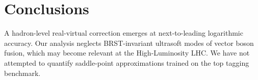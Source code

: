 \section{Conclusions}\label{sec:conclusions}

A hadron-level real-virtual correction emerges at next-to-leading
logarithmic accuracy. Our analysis neglects BRST-invariant ultrasoft
modes of vector boson fusion, which may become relevant at the
High-Luminosity LHC. We have not attempted to quantify saddle-point
approximations trained on the top tagging benchmark.

